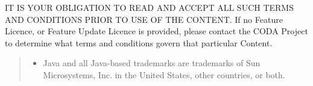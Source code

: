 IT IS YOUR OBLIGATION TO READ AND ACCEPT ALL SUCH TERMS AND
CONDITIONS PRIOR TO USE OF THE CONTENT.  If no Feature
Licence, or Feature Update Licence is provided, please contact the
CODA Project to determine what terms and conditions govern
that particular Content.
\begin{quote}
  \footnotesize

  \begin{itemize}
  \item  Java and all Java-based trademarks are trademarks of Sun
    Microsystems, Inc. in the United States, other countries, or
    both.
  \end{itemize}
\end{quote}

